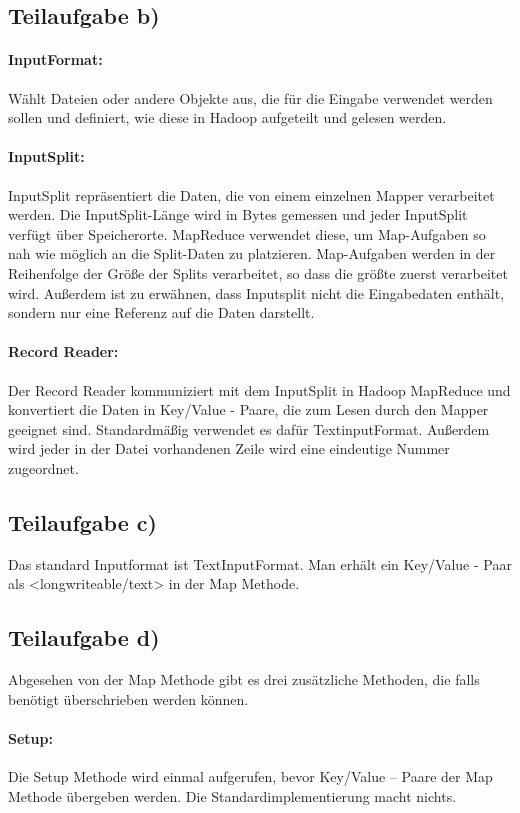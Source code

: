 \documentclass{article}
\begin{document}
\subsection{Teilaufgabe b)}

\paragraph{InputFormat:}
Wählt Dateien oder andere Objekte aus, die für die Eingabe verwendet werden sollen und definiert, wie diese in Hadoop aufgeteilt und gelesen werden.

\paragraph{InputSplit:}
InputSplit repräsentiert die Daten, die von einem einzelnen Mapper verarbeitet werden. Die InputSplit-Länge wird in Bytes gemessen und jeder InputSplit verfügt über Speicherorte. MapReduce verwendet diese, um Map-Aufgaben so nah wie möglich an die Split-Daten zu platzieren. Map-Aufgaben werden in der Reihenfolge der Größe der Splits verarbeitet, so dass die größte zuerst verarbeitet wird. Außerdem ist zu erwähnen, dass Inputsplit nicht die Eingabedaten enthält, sondern nur eine Referenz auf die Daten darstellt.

\paragraph{Record Reader:}
Der Record Reader kommuniziert mit dem InputSplit in Hadoop MapReduce und konvertiert die Daten in Key/Value - Paare, die zum Lesen durch den Mapper geeignet sind. Standardmäßig verwendet es dafür TextinputFormat. Außerdem wird jeder in der Datei vorhandenen Zeile wird eine eindeutige Nummer zugeordnet.

\subsection{Teilaufgabe c)}
Das standard Inputformat ist TextInputFormat. Man erhält ein Key/Value - Paar als <longwriteable/text> in der Map Methode.

\subsection{Teilaufgabe d)}
Abgesehen von der Map Methode gibt es drei zusätzliche Methoden, die falls benötigt überschrieben werden können.

\paragraph{Setup:}
Die Setup Methode wird einmal aufgerufen, bevor Key/Value – Paare der Map Methode übergeben werden. Die Standardimplementierung macht nichts.
\end{document}
